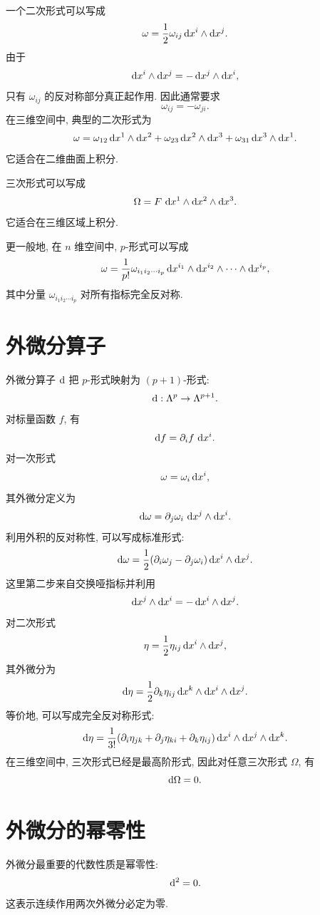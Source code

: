 一个二次形式可以写成
\[
\omega
=
\frac{1}{2}\omega_{ij}\dif x^i\wedge \dif x^j.
\]
由于
\[
\dif x^i\wedge \dif x^j=-\dif x^j\wedge \dif x^i,
\]
只有 $\omega_{ij}$ 的反对称部分真正起作用. 因此通常要求
\[
\omega_{ij}=-\omega_{ji}.
\]
在三维空间中, 典型的二次形式为
\[
\omega
=
\omega_{12}\dif x^1\wedge \dif x^2
+
\omega_{23}\dif x^2\wedge \dif x^3
+
\omega_{31}\dif x^3\wedge \dif x^1.
\]
它适合在二维曲面上积分. 

三次形式可以写成
\[
\Omega
=
F\,\dif x^1\wedge \dif x^2\wedge \dif x^3.
\]
它适合在三维区域上积分. 

更一般地, 在 $n$ 维空间中, $p$-形式可以写成
\[
\omega
=
\frac{1}{p!}\omega_{i_1i_2\cdots i_p}
\dif x^{i_1}\wedge \dif x^{i_2}\wedge\cdots\wedge \dif x^{i_p},
\]
其中分量 $\omega_{i_1i_2\cdots i_p}$ 对所有指标完全反对称. 

\section{外微分算子}

外微分算子 $\dif$ 把 $p$-形式映射为 $(p+1)$-形式: 
\[
\dif:\Lambda^p\to\Lambda^{p+1}.
\]
对标量函数 $f$, 有
\[
\dif f=\partial_i f\,\dif x^i.
\]
对一次形式
\[
\omega=\omega_i \dif x^i,
\]
其外微分定义为
\[
\dif\omega
=
\partial_j\omega_i\,\dif x^j\wedge \dif x^i.
\]
利用外积的反对称性, 可以写成标准形式: 
\[
\dif\omega
=
\frac{1}{2}
(\partial_i\omega_j-\partial_j\omega_i)
\dif x^i\wedge \dif x^j.
\]
这里第二步来自交换哑指标并利用
\[
\dif x^j\wedge \dif x^i=-\dif x^i\wedge \dif x^j.
\]
对二次形式
\[
\eta
=
\frac{1}{2}\eta_{ij}\dif x^i\wedge \dif x^j,
\]
其外微分为
\[
\dif\eta
=
\frac{1}{2}\partial_k\eta_{ij}
\dif x^k\wedge \dif x^i\wedge \dif x^j.
\]
等价地, 可以写成完全反对称形式: 
\[
\dif\eta
=
\frac{1}{3!}
(\partial_i\eta_{jk}
+
\partial_j\eta_{ki}
+
\partial_k\eta_{ij})
\dif x^i\wedge \dif x^j\wedge \dif x^k.
\]
在三维空间中, 三次形式已经是最高阶形式, 因此对任意三次形式 $\Omega$, 有
\[
\dif\Omega=0.
\]
\section{外微分的幂零性}

外微分最重要的代数性质是幂零性: 
\[
\dif^{2}=0.
\]
这表示连续作用两次外微分必定为零. 

